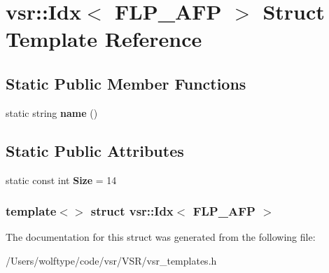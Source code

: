 \hypertarget{structvsr_1_1_idx_3_01_f_l_p___a_f_p_01_4}{\section{vsr\-:\-:Idx$<$ F\-L\-P\-\_\-\-A\-F\-P $>$ Struct Template Reference}
\label{structvsr_1_1_idx_3_01_f_l_p___a_f_p_01_4}
}
\subsection*{Static Public Member Functions}
\begin{DoxyCompactItemize}
\item 
\hypertarget{structvsr_1_1_idx_3_01_f_l_p___a_f_p_01_4_ae5f64d54e5e3445ab383b852280e04bc}{static string {\bfseries name} ()}\label{structvsr_1_1_idx_3_01_f_l_p___a_f_p_01_4_ae5f64d54e5e3445ab383b852280e04bc}

\end{DoxyCompactItemize}
\subsection*{Static Public Attributes}
\begin{DoxyCompactItemize}
\item 
\hypertarget{structvsr_1_1_idx_3_01_f_l_p___a_f_p_01_4_a7573e0c511c04dc959c4aec161b36f14}{static const int {\bfseries Size} = 14}\label{structvsr_1_1_idx_3_01_f_l_p___a_f_p_01_4_a7573e0c511c04dc959c4aec161b36f14}

\end{DoxyCompactItemize}
\subsubsection*{template$<$$>$ struct vsr\-::\-Idx$<$ F\-L\-P\-\_\-\-A\-F\-P $>$}



The documentation for this struct was generated from the following file\-:\begin{DoxyCompactItemize}
\item 
/\-Users/wolftype/code/vsr/\-V\-S\-R/vsr\-\_\-templates.\-h\end{DoxyCompactItemize}

